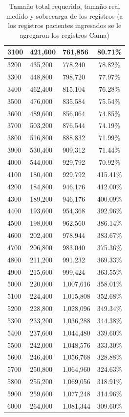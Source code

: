 \begin{table}[h]
\begin{tabular}{|l|p{4cm}|p{4cm}|c|}
3100 & 421,600 & 761,856 & 80.71\% \\ \hline
3200 & 435,200 & 778,240 & 78.82\% \\ \hline
3300 & 448,800 & 798,720 & 77.97\% \\ \hline
3400 & 462,400 & 815,104 & 76.28\% \\ \hline
3500 & 476,000 & 835,584 & 75.54\% \\ \hline
3600 & 489,600 & 856,064 & 74.85\% \\ \hline
3700 & 503,200 & 876,544 & 74.19\% \\ \hline
3800 & 516,800 & 888,832 & 71.99\% \\ \hline
3900 & 530,400 & 909,312 & 71.44\% \\ \hline
4000 & 544,000 & 929,792 & 70.92\% \\ \hline
4100 & 180,400 & 929,792 & 415.41\% \\ \hline
4200 & 184,800 & 946,176 & 412.00\% \\ \hline
4300 & 189,200 & 946,176 & 400.09\% \\ \hline
4400 & 193,600 & 954,368 & 392.96\% \\ \hline
4500 & 198,000 & 962,560 & 386.14\% \\ \hline
4600 & 202,400 & 978,944 & 383.67\% \\ \hline
4700 & 206,800 & 983,040 & 375.36\% \\ \hline
4800 & 211,200 & 991,232 & 369.33\% \\ \hline
4900 & 215,600 & 999,424 & 363.55\% \\ \hline
5000 & 220,000 & 1,007,616 & 358.01\% \\ \hline
5100 & 224,400 & 1,015,808 & 352.68\% \\ \hline
5200 & 228,800 & 1,028,096 & 349.34\% \\ \hline
5300 & 233,200 & 1,036,288 & 344.38\% \\ \hline
5400 & 237,600 & 1,044,480 & 339.60\% \\ \hline
5500 & 242,000 & 1,048,576 & 333.30\% \\ \hline
5600 & 246,400 & 1,056,768 & 328.88\% \\ \hline
5700 & 250,800 & 1,064,960 & 324.63\% \\ \hline
5800 & 255,200 & 1,069,056 & 318.91\% \\ \hline
5900 & 259,600 & 1,077,248 & 314.96\% \\ \hline
6000 & 264,000 & 1,081,344 & 309.60\% \\ \hline
\end{tabular}
\caption{Tamaño total requerido, tamaño real medido y sobrecarga de los registros (a los registros pacientes ingresados se le agregaron los registros Cama)}
\label{tabla:TamReqYRealConOverCamas}
\end{table}
